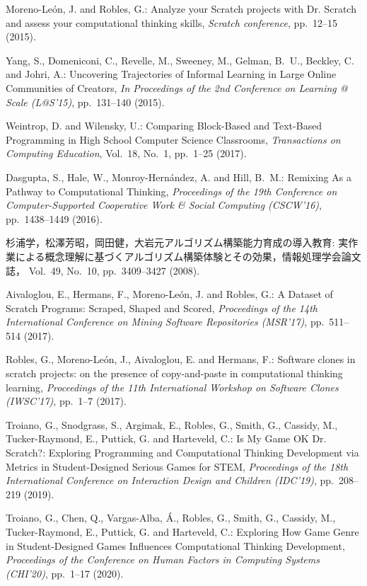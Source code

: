 \documentclass[submit]{ipsj}
\begin{document}
{\begin{thebibliography}{10}
Moreno-Le{\'o}n, J. and Robles, G.: Analyze your Scratch projects with Dr.
  Scratch and assess your computational thinking skills, {\em Scratch
  conference}, pp.\ 12--15 (2015).

Yang, S., Domeniconi, C., Revelle, M., Sweeney, M., Gelman, B.~U., Beckley, C.
  and Johri, A.: Uncovering Trajectories of Informal Learning in Large Online
  Communities of Creators, {\em In Proceedings of the 2nd Conference on
  Learning @ Scale (L@S'15)}, pp.\ 131--140 (2015).

Weintrop, D. and Wilensky, U.: Comparing Block-Based and Text-Based Programming
  in High School Computer Science Classrooms, {\em Transactions on Computing
  Education},  Vol.~18, No.~1, pp.\ 1--25 (2017).

Dasgupta, S., Hale, W., Monroy-Hern\'{a}ndez, A. and Hill, B.~M.: Remixing As a
  Pathway to Computational Thinking, {\em Proceedings of the 19th Conference on
  Computer-Supported Cooperative Work \& Social Computing (CSCW'16)}, pp.\
  1438--1449 (2016).

杉浦学，松澤芳昭，岡田健，大岩元\：アルゴリズム構築能力育成の導入教育:
  実作業による概念理解に基づくアルゴリズム構築体験とその効果，情報処理学会論文誌，
  Vol.~49, No.~10, pp.\ 3409--3427 (2008).

Aivaloglou, E., Hermans, F., Moreno-Le\'{o}n, J. and Robles, G.: A Dataset of
  Scratch Programs: Scraped, Shaped and Scored, {\em Proceedings of the 14th
  International Conference on Mining Software Repositories (MSR'17)}, pp.\
  511--514 (2017).

Robles, G., Moreno-Le{\'o}n, J., Aivaloglou, E. and Hermans, F.: Software
  clones in scratch projects: on the presence of copy-and-paste in
  computational thinking learning, {\em Proceedings of the 11th International
  Workshop on Software Clones (IWSC'17)}, pp.\ 1--7 (2017).

Troiano, G., Snodgrass, S., Argimak, E., Robles, G., Smith, G., Cassidy, M.,
  Tucker-Raymond, E., Puttick, G. and Harteveld, C.: Is My Game OK Dr.
  Scratch?: Exploring Programming and Computational Thinking Development via
  Metrics in Student-Designed Serious Games for STEM, {\em Proceedings of the
  18th International Conference on Interaction Design and Children (IDC'19)},
  pp.\ 208--219 (2019).

Troiano, G., Chen, Q., Vargas-Alba, {\'A}., Robles, G., Smith, G., Cassidy, M.,
  Tucker-Raymond, E., Puttick, G. and Harteveld, C.: Exploring How Game Genre
  in Student-Designed Games Influences Computational Thinking Development, {\em
  Proceedings of the Conference on Human Factors in Computing Systems
  (CHI'20)}, pp.\ 1--17 (2020).


\end{thebibliography}}
\end{document}
